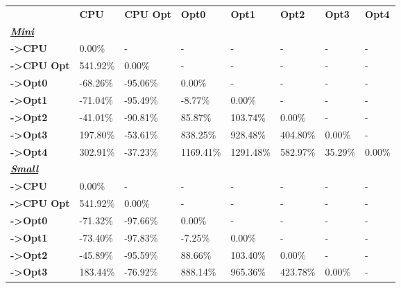 \begin{table}[H]
    \centering
    \begin{tabular}{llllllll}
    \rowcolor[HTML]{DAE8FC} \ &  \textbf{CPU} &  \textbf{CPU Opt} &  \textbf{Opt0} &  \textbf{Opt1} &  \textbf{Opt2} &  \textbf{Opt3} &  \textbf{Opt4} \\
    \cellcolor[HTML]{DAE8FC} \textbf{\textbf{{\emph{{\underline{{Mini}}}}}}} &  &  &  &  &  &  &  \\
    \rowcolor[HTML]{EFEFEF} \cellcolor[HTML]{DAE8FC} \textbf{->CPU} & 0.00\% & - & - & - & - & - & - \\
    \cellcolor[HTML]{DAE8FC} \textbf{->CPU Opt} & 541.92\% & 0.00\% & - & - & - & - & - \\
    \rowcolor[HTML]{EFEFEF} \cellcolor[HTML]{DAE8FC} \textbf{->Opt0} & -68.26\% & -95.06\% & 0.00\% & - & - & - & - \\
    \cellcolor[HTML]{DAE8FC} \textbf{->Opt1} & -71.04\% & -95.49\% & -8.77\% & 0.00\% & - & - & - \\
    \rowcolor[HTML]{EFEFEF} \cellcolor[HTML]{DAE8FC} \textbf{->Opt2} & -41.01\% & -90.81\% & 85.87\% & 103.74\% & 0.00\% & - & - \\
    \cellcolor[HTML]{DAE8FC} \textbf{->Opt3} & 197.80\% & -53.61\% & 838.25\% & 928.48\% & 404.80\% & 	0.00\% & - \\
    \rowcolor[HTML]{EFEFEF} \cellcolor[HTML]{DAE8FC} \textbf{->Opt4} & 302.91\% & -37.23\% & 1169.41\% & 1291.48\% & 582.97\% & 	35.29\% & 	0.00\% \\
    \cellcolor[HTML]{DAE8FC} \textbf{\textbf{{\emph{{\underline{{Small}}}}}}} &  &  &  &  &  &  &  \\
    \rowcolor[HTML]{EFEFEF} \cellcolor[HTML]{DAE8FC} \textbf{->CPU} & 0.00\% & - & - & - & - & - & - \\
    \cellcolor[HTML]{DAE8FC} \textbf{->CPU Opt} & 541.92\% & 0.00\% & - & - & - & - & - \\
    \rowcolor[HTML]{EFEFEF} \cellcolor[HTML]{DAE8FC} \textbf{->Opt0} & -71.32\% & -97.66\% & 0.00\% & - & - & - & - \\
    \cellcolor[HTML]{DAE8FC} \textbf{->Opt1} & -73.40\% & -97.83\% & -7.25\% & 0.00\% & - & - & - \\
    \rowcolor[HTML]{EFEFEF} \cellcolor[HTML]{DAE8FC} \textbf{->Opt2} & -45.89\% & -95.59\% & 88.66\% & 103.40\% & 0.00\% & - & - \\
    \cellcolor[HTML]{DAE8FC} \textbf{->Opt3} & 183.44\% & -76.92\% & 888.14\% & 965.36\% & 423.78\% & 	0.00\% & - \\

\end{tabular}
\end{table}
